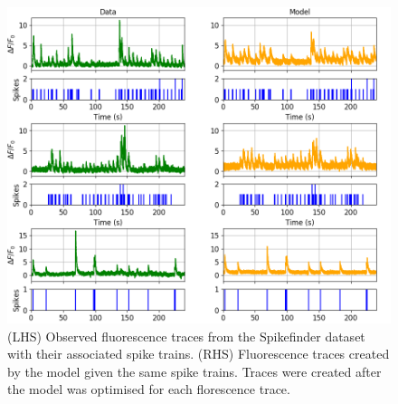 \documentclass[a4paper,12pt]{article}
\theoremstyle{definition}
\begin{document}
\begin{figure}[p]
  \includegraphics[width=\textwidth]{figures/trace_comparison.png}
  \caption{(LHS) Observed fluorescence traces from the Spikefinder dataset with their associated spike trains. (RHS) Fluorescence traces created by the model given the same spike trains. Traces were created after the model was optimised for each florescence trace.}
  \label{fig:observed_modelled_examples}
\end{figure}
\end{document}
